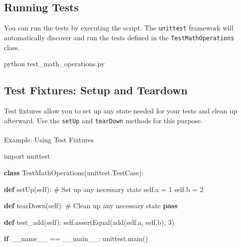 \documentclass[
  letterpaper,
  DIV=11,
  numbers=noendperiod]{scrreprt}
\makeatletter
\let\oldparagraph\paragraph
\renewcommand{\paragraph}{
    \@ifstar
      \xxxParagraphStar
      \xxxParagraphNoStar
  }
\newcommand{\xxxParagraphStar}[1]{\oldparagraph*{#1}\mbox{}}
\newcommand{\xxxParagraphNoStar}[1]{\oldparagraph{#1}\mbox{}}
\newenvironment{Shaded}{\begin{snugshade}}{\end{snugshade}}
\newcommand{\CommentTok}[1]{\textcolor[rgb]{0.37,0.37,0.37}{#1}}
\newcommand{\ControlFlowTok}[1]{\textcolor[rgb]{0.00,0.23,0.31}{\textbf{#1}}}
\newcommand{\DecValTok}[1]{\textcolor[rgb]{0.68,0.00,0.00}{#1}}
\newcommand{\ExtensionTok}[1]{\textcolor[rgb]{0.00,0.23,0.31}{#1}}
\newcommand{\ImportTok}[1]{\textcolor[rgb]{0.00,0.46,0.62}{#1}}
\newcommand{\KeywordTok}[1]{\textcolor[rgb]{0.00,0.23,0.31}{\textbf{#1}}}
\newcommand{\NormalTok}[1]{\textcolor[rgb]{0.00,0.23,0.31}{#1}}
\newcommand{\OperatorTok}[1]{\textcolor[rgb]{0.37,0.37,0.37}{#1}}
\newcommand{\StringTok}[1]{\textcolor[rgb]{0.13,0.47,0.30}{#1}}
\newcommand{\VariableTok}[1]{\textcolor[rgb]{0.07,0.07,0.07}{#1}}
\makeatother
\begin{document}
\subsection{Running Tests}\label{running-tests}

You can run the tests by executing the script. The \texttt{unittest}
framework will automatically discover and run the tests defined in the
\texttt{TestMathOperations} class.

\begin{Shaded}
\begin{Highlighting}[]
\ExtensionTok{python}\NormalTok{ test\_math\_operations.py}
\end{Highlighting}
\end{Shaded}

\subsection{Test Fixtures: Setup and
Teardown}\label{test-fixtures-setup-and-teardown}

Test fixtures allow you to set up any state needed for your tests and
clean up afterward. Use the \texttt{setUp} and \texttt{tearDown} methods
for this purpose.

\paragraph{Example: Using Test
Fixtures}\label{example-using-test-fixtures}

\begin{Shaded}
\begin{Highlighting}[]
\ImportTok{import}\NormalTok{ unittest}

\KeywordTok{class}\NormalTok{ TestMathOperations(unittest.TestCase):}

    \KeywordTok{def}\NormalTok{ setUp(}\VariableTok{self}\NormalTok{):}
        \CommentTok{\# Set up any necessary state}
        \VariableTok{self}\NormalTok{.a }\OperatorTok{=} \DecValTok{1}
        \VariableTok{self}\NormalTok{.b }\OperatorTok{=} \DecValTok{2}

    \KeywordTok{def}\NormalTok{ tearDown(}\VariableTok{self}\NormalTok{):}
        \CommentTok{\# Clean up any necessary state}
        \ControlFlowTok{pass}

    \KeywordTok{def}\NormalTok{ test\_add(}\VariableTok{self}\NormalTok{):}
        \VariableTok{self}\NormalTok{.assertEqual(add(}\VariableTok{self}\NormalTok{.a, }\VariableTok{self}\NormalTok{.b), }\DecValTok{3}\NormalTok{)}

\ControlFlowTok{if} \VariableTok{\_\_name\_\_} \OperatorTok{==} \StringTok{\textquotesingle{}\_\_main\_\_\textquotesingle{}}\NormalTok{:}
\NormalTok{    unittest.main()}
\end{Highlighting}
\end{Shaded}
\end{document}
